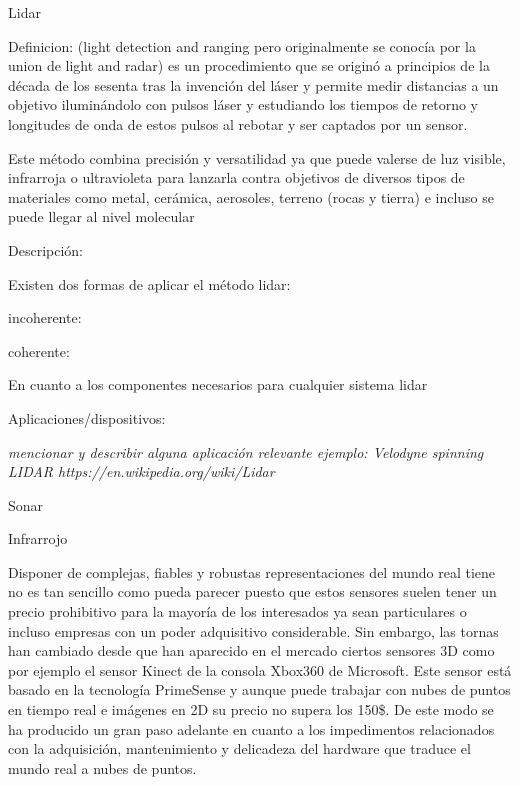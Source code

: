 \begin{list}{-}
\item Lidar

Definicion:
(light detection and ranging pero originalmente se conocía por la union de light and radar)
es un procedimiento que se originó a principios de la década de los sesenta tras la invención del láser y permite medir distancias a un objetivo iluminándolo con pulsos láser y estudiando los tiempos de retorno y longitudes de onda de estos pulsos al rebotar y ser captados por un sensor.

Este método combina precisión y versatilidad ya que puede valerse de luz visible, infrarroja o ultravioleta para lanzarla contra objetivos de diversos tipos de materiales como metal, cerámica, aerosoles, terreno (rocas y tierra) e incluso se puede llegar al nivel molecular

Descripción:

Existen dos formas de aplicar el método lidar:
\begin{list}{•}
\item incoherente: 
\item coherente:
\end{list}

En cuanto a los componentes necesarios para cualquier sistema lidar 

Aplicaciones/dispositivos:

\textit{mencionar y describir alguna aplicación relevante ejemplo: Velodyne spinning LIDAR https://en.wikipedia.org/wiki/Lidar}

\item Sonar
\item Infrarrojo
\end{list}

Disponer de complejas, fiables y robustas representaciones del mundo real tiene no es tan sencillo como pueda parecer puesto que estos sensores suelen tener un precio prohibitivo para la mayoría de los interesados ya sean particulares o incluso empresas con un poder adquisitivo considerable. Sin embargo, las tornas han cambiado desde que han aparecido en el mercado ciertos sensores 3D como por ejemplo el sensor Kinect de la consola Xbox360 de Microsoft. Este sensor está basado en la tecnología PrimeSense y aunque puede trabajar con nubes de puntos en tiempo real e imágenes en 2D su precio no supera los 150\$. De este modo se ha producido un gran paso adelante en cuanto a los impedimentos relacionados con la adquisición, mantenimiento y delicadeza del hardware que traduce el mundo real a nubes de puntos.

